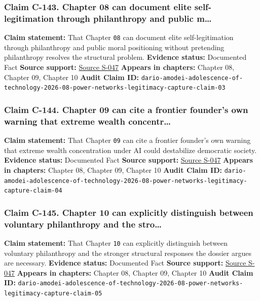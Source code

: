 \documentclass[
  american,
  11pt,
  letterpaper,
]{article}
\begin{document}
\subsubsection{Claim C-143. Chapter 08 can document elite
self-legitimation through philanthropy and public
m\ldots{}}\label{claim-c-143-chapter-08-can-document-elite-self-legitimation-through-philanthropy-and-public-m}

\textbf{Claim statement:} That Chapter \texttt{08} can document elite
self-legitimation through philanthropy and public moral positioning
without pretending philanthropy resolves the structural problem.
\textbf{Evidence status:} Documented Fact \textbf{Source support:}
\hyperref[source-s-047-the-adolescence-of-technology]{Source S-047}
\textbf{Appears in chapters:} Chapter 08, Chapter 09, Chapter 10
\textbf{Audit Claim ID:}
\texttt{dario-amodei-adolescence-of-technology-2026-08-power-networks-legitimacy-capture-claim-03}

\subsubsection{Claim C-144. Chapter 09 can cite a frontier founder's own
warning that extreme wealth
concentr\ldots{}}\label{claim-c-144-chapter-09-can-cite-a-frontier-founder-s-own-warning-that-extreme-wealth-concentr}

\textbf{Claim statement:} That Chapter \texttt{09} can cite a frontier
founder's own warning that extreme wealth concentration under AI could
destabilize democratic society. \textbf{Evidence status:} Documented
Fact \textbf{Source support:}
\hyperref[source-s-047-the-adolescence-of-technology]{Source S-047}
\textbf{Appears in chapters:} Chapter 08, Chapter 09, Chapter 10
\textbf{Audit Claim ID:}
\texttt{dario-amodei-adolescence-of-technology-2026-08-power-networks-legitimacy-capture-claim-04}

\subsubsection{Claim C-145. Chapter 10 can explicitly distinguish
between voluntary philanthropy and the
stro\ldots{}}\label{claim-c-145-chapter-10-can-explicitly-distinguish-between-voluntary-philanthropy-and-the-stro}

\textbf{Claim statement:} That Chapter \texttt{10} can explicitly
distinguish between voluntary philanthropy and the stronger structural
responses the dossier argues are necessary. \textbf{Evidence status:}
Documented Fact \textbf{Source support:}
\hyperref[source-s-047-the-adolescence-of-technology]{Source S-047}
\textbf{Appears in chapters:} Chapter 08, Chapter 09, Chapter 10
\textbf{Audit Claim ID:}
\texttt{dario-amodei-adolescence-of-technology-2026-08-power-networks-legitimacy-capture-claim-05}
\end{document}
